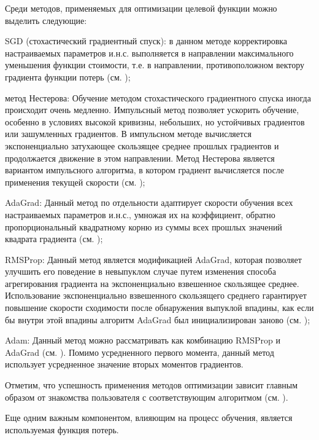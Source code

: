 Среди методов, применяемых для оптимизации целевой функции можно выделить следующие:

\begin{textitemize}
	\item SGD (стохастический градиентный спуск): в данном методе корректировка настраиваемых параметров и.н.с. выполняется в направлении максимального уменьшения функции стоимости, т.е. в направлении, противоположном вектору градиента функции потерь (см. );
	\item метод Нестерова: Обучение методом стохастического градиентного спуска иногда происходит очень медленно. Импульсный метод позволяет ускорить обучение, особенно в условиях высокой кривизны, небольших, но устойчивых градиентов или зашумленных градиентов. В импульсном методе вычисляется экспоненциально затухающее скользящее среднее прошлых градиентов и продолжается движение в этом направлении. Метод Нестерова является вариантом импульсного алгоритма, в котором градиент вычисляется после применения текущей скорости (см. );
	\item AdaGrad: Данный метод по отдельности адаптирует скорости обучения всех настраиваемых параметров и.н.с., умножая их на коэффициент, обратно пропорциональный квадратному корню из суммы всех прошлых значений квадрата градиента (см. );
	\item RMSProp: Данный метод является модификацией AdaGrad, которая позволяет улучшить его поведение в невыпуклом случае путем изменения способа агрегирования градиента на экспоненциально взвешенное скользящее среднее. Использование экспоненциально взвешенного скользящего среднего гарантирует повышение скорости сходимости после обнаружения выпуклой впадины, как если бы внутри этой впадины алгоритм AdaGrad был инициализирован заново (см. );
	\item Adam: Данный метод можно рассматривать как комбинацию RMSProp и AdaGrad (см. ). Помимо усредненного первого момента, данный метод использует усредненное значение вторых моментов градиентов.
\end{textitemize}

Отметим, что успешность применения методов оптимизации зависит главным образом от знакомства пользователя с соответствующим алгоритмом (см. ).

Еще одним важным компонентом, влияющим на процесс обучения, является используемая функция потерь.

